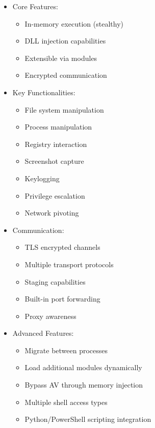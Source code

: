 \begin{itemize}
	\item Core Features:
  \begin{itemize}
    \tightlist
		\item In-memory execution (stealthy)
		\item DLL injection capabilities
		\item Extensible via modules
		\item Encrypted communication
  \end{itemize}

	\item Key Functionalities:
  \begin{itemize}
    \tightlist
		\item File system manipulation
		\item Process manipulation
		\item Registry interaction 
		\item Screenshot capture
		\item Keylogging
		\item Privilege escalation
		\item Network pivoting
  \end{itemize}

	\item Communication:
  \begin{itemize}
    \tightlist
		\item TLS encrypted channels
		\item Multiple transport protocols
		\item Staging capabilities
		\item Built-in port forwarding
		\item Proxy awareness
  \end{itemize}

	\item Advanced Features:
  \begin{itemize}
    \tightlist
		\item Migrate between processes
		\item Load additional modules dynamically
		\item Bypass AV through memory injection
		\item Multiple shell access types
		\item Python/PowerShell scripting integration
  \end{itemize}
\end{itemize}

